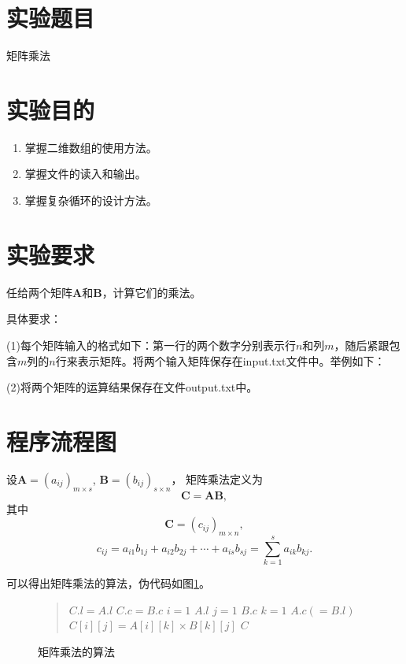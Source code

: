 \documentclass[cs4size,a4paper,nofonts]{ctexart}
\begin{document}
\newpage

\section{实验题目}
矩阵乘法
\section{实验目的}
\begin{enumerate}[topsep=0pt,partopsep=0pt,itemsep=0pt,parsep=0pt]
\item 掌握二维数组的使用方法。 
\item 掌握文件的读入和输出。 
\item 掌握复杂循环的设计方法。
\end{enumerate}
\section{实验要求}
任给两个矩阵$\bm A$和$\bm B$，计算它们的乘法。

具体要求：

(1)每个矩阵输入的格式如下：第一行的两个数字分别表示行$n$和列$m$，随后紧跟包含$m$列的$n$行来表示矩阵。将两个输入矩阵保存在input.txt文件中。举例如下：
\begin{quote}

\end{quote}

(2)将两个矩阵的运算结果保存在文件output.txt中。

\section{程序流程图}

设$\bm A = (a_{ij})_{m \times s}$, $\bm B = (b_{ij})_{s \times n}$，
矩阵乘法定义为$$\bm C=\bm A  \bm B,$$
其中 $$\bm C=(c_{ij})_{m\times n},$$
$$c_{ij} = a_{i1}b_{1j} + a_{i2}b_{2j} + \cdots + a_{is}b_{sj}
= \sum_{k=1}^{s}{a_{ik}b_{kj}}.$$

可以得出矩阵乘法的算法，伪代码如图\ref{mul}。
\begin{figure}[htp]
\begin{quote}
\begin{codebox}
\li $C.l = A.l$
\li $C.c = B.c$
\li \For $i = 1$ \To $A.l$ \Do
\li   \For $j = 1$ \To $B.c$ \Do
\li     \For $k = 1$ \To $A.c(=B.l)$ \Do
\li       $C[i][j] = A[i][k]\times B[k][j]$
        \End
      \End
    \End
\li \Return $C$
\end{codebox}
\end{quote}
\caption{\label{mul}矩阵乘法的算法}
\end{figure}
\end{document}
